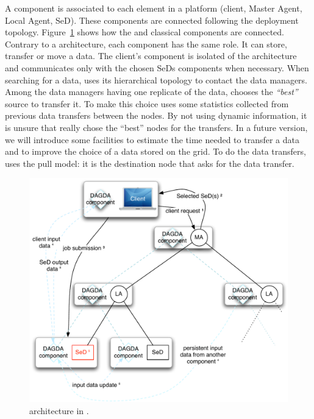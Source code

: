 A \dagda component is associated to each element in a \diet platform (client,
Master Agent, Local Agent, SeD). These components are connected following the
\diet deployment topology. Figure~\ref{fig:DAGDAarch} shows how the \dagda and
\diet classical components are connected. Contrary to a \diet architecture,
each \dagda component has the same role. It can store, transfer or move a
data. The client's \dagda component is isolated of the architecture and
communicates only with the chosen SeDs \dagda components when necessary. When
searching for a data, \dagda uses its hierarchical topology to contact the data
managers. Among the data managers having one replicate of the data, \dagda
chooses the \textit{``best''} source to transfer it. To make this choice \dagda
uses some statistics collected from previous data transfers between the
nodes. By not using dynamic information, it is unsure that \dagda really chose
the ``best'' nodes for the transfers. In a future version, we will introduce some
facilities to estimate the time needed to transfer a data and to improve the
choice of a data stored on the grid. To do the data transfers, \dagda uses the
pull model: it is the destination node that asks for the data transfer.
\begin{figure}[h]
\centerline{\includegraphics[width=0.7\linewidth]{fig/dagdaArch}}
\caption{\dagda architecture in \diet.\label{fig:DAGDAarch}}
\end{figure}

